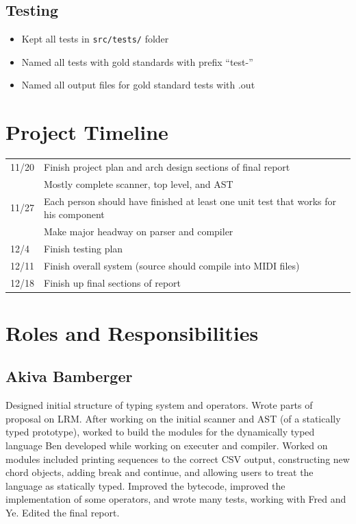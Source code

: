 \documentclass[12pt,A4]{book}
\begin{document}
\subsection{Testing}
\begin{itemize}
\item Kept all tests in \verb|src/tests/| folder
\item Named all tests with gold standards with prefix ``test-''
\item Named all output files for gold standard tests with .out
\end{itemize}
\section{Project Timeline}
\begin{tabular}{l p{}}
11/20 & Finish project plan and arch design sections of final report\\
      & Mostly complete scanner, top level, and AST\\
11/27 & Each person should have finished at least one unit test that works for his component\\
      & Make major headway on parser and compiler\\
12/4 & Finish testing plan\\
12/11 & Finish overall system (source should compile into MIDI files)\\
12/18 & Finish up final sections of report\\
\end{tabular}
\section{Roles and Responsibilities}
\subsection{Akiva Bamberger}
Designed initial structure of typing system and operators. Wrote parts of proposal on LRM. After working on the initial scanner and AST (of a statically typed prototype), worked to build the modules for the dynamically typed language Ben developed while working on executer and compiler. Worked on modules included printing sequences to the correct CSV output, constructing new chord objects, adding break and continue, and allowing users to treat the language as statically typed. Improved the bytecode, improved the implementation of some operators, and wrote many tests, working with Fred and Ye. Edited the final report.
\end{document}
